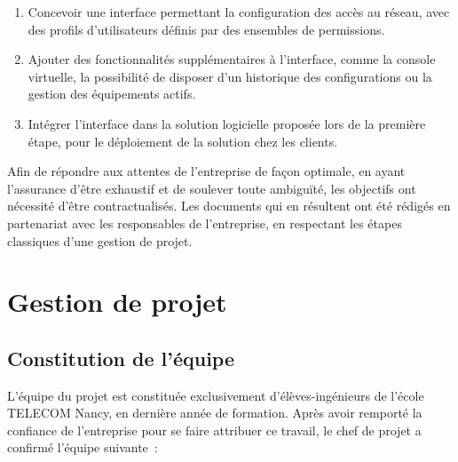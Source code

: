 \begin{enumerate}
\item Concevoir une interface permettant la configuration des accès au réseau, avec des profils d'utilisateurs définis par des ensembles de permissions.
\item Ajouter des fonctionnalités supplémentaires à l'interface, comme la console virtuelle, la possibilité de disposer d'un historique des configurations ou la gestion des équipements actifs.
\item Intégrer l'interface dans la solution logicielle proposée lors de la première étape, pour le déploiement de la solution chez les clients.
\end{enumerate}

Afin de répondre aux attentes de l'entreprise de façon optimale, en ayant l'assurance d'être exhaustif et de soulever toute ambiguïté, les objectifs ont nécessité d'être contractualisés. Les documents qui en résultent ont été rédigés en partenariat avec les responsables de l'entreprise, en respectant les étapes classiques d'une gestion de projet.

\section{Gestion de projet}
\subsection{Constitution de l'équipe}

L'équipe du projet est constituée exclusivement d'élèves-ingénieurs de l'école TELECOM Nancy, en dernière année de formation. Après avoir remporté la confiance de l'entreprise pour se faire attribuer ce travail, le chef de projet a confirmé l'équipe suivante~:


